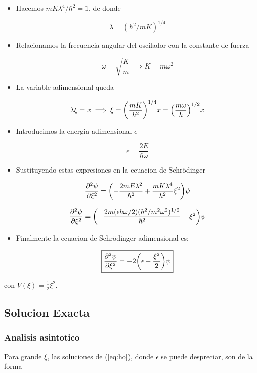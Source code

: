 \documentclass[11pt]{article}
\begin{document}
\begin{itemize}
\item Hacemos \(mK\lambda^4 /\hbar^2 = 1\), de donde

\[ \lambda = (\hbar^2/mK)^{1/4} \]

\item Relacionamos la frecuencia angular del oscilador con la constante de fuerza

\[ \omega = \sqrt{\frac{K}{m}} \implies K = m\omega^2 \]

\item La variable adimensional queda

\[ \lambda\xi = x \implies \xi=\qty(\frac{mK}{\hbar^2})^{1/4} x = \qty(\frac{m \omega}{\hbar})^{1/2} x  \]

\item Introducimos la energia adimensional \(\epsilon\)

\[ \epsilon = \frac{2E}{\hbar \omega} \]

\item Sustituyendo estas expresiones en la ecuacion de Schrödinger

\[ \pdv[2]{\psi}{\xi} = \qty( - \frac{2m E \lambda^{2}}{\hbar^2} + \frac{mK \lambda^4}{\hbar^2} \xi^2  )\psi \]

\[ \pdv[2]{\psi}{\xi} = \qty( - \frac{2m (\epsilon \hbar \omega/2) (\hbar^2/m^2\omega^2)^{1/2}}{\hbar^2} +  \xi^2  )\psi \]

\item Finalmente la ecuacion de Schrödinger adimensional es:

\begin{equation}
\label{eq:ho}
\boxed{\pdv[2]{\psi}{\xi} = -2\qty(\epsilon - \frac{\xi^2}{2})\psi}
\end{equation}
\end{itemize}

con \(V(\xi) = \frac{1}{2}\xi^2\).
\subsection{Solucion Exacta}
\label{sec:orgf4bf1a0}

\subsubsection{Analisis asintotico}
\label{sec:org2788a5b}

Para grande \(\xi\), las soluciones de (\ref{eq:ho}), donde \(\epsilon\) se puede despreciar, son de la forma
\end{document}
